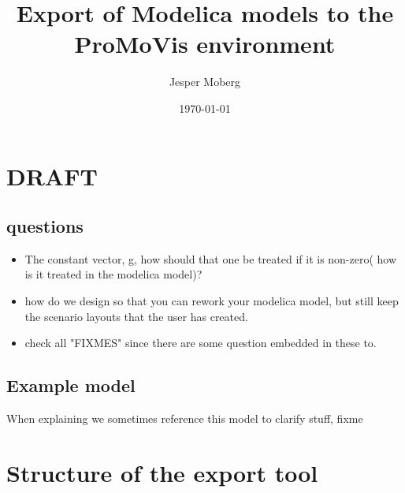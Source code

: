 \documentclass{report}
\begin{document}
\title{\Huge\bf Export of Modelica models to the ProMoVis environment}
\author{Jesper Moberg}
\date{\today}
\maketitle

\tableofcontents

\chapter{DRAFT}
\section{questions}
\begin{itemize}
\item The constant vector, g, how should that one be treated if it is non-zero( how is it treated in the modelica model)?
\item how do we design so that you can rework your modelica model, but still keep the scenario layouts that the user has created.
\item check all "FIXMES" since there are some question embedded in these to.

\end{itemize}
\section{Example model}
When explaining we sometimes reference this model to clarify stuff, fixme
\newpage




\chapter{Structure of the export tool}
\end{document}
